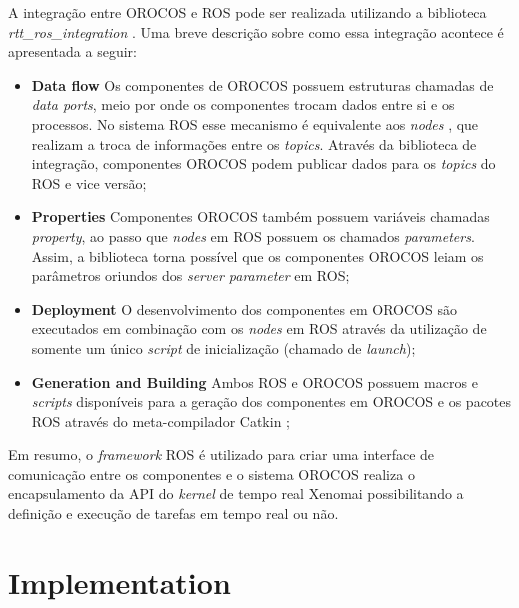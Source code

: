 \documentclass[conference]{IEEEtran}
\begin{document}
A integração entre OROCOS e ROS pode ser realizada utilizando a biblioteca \textit{rtt\_ros\_integration} \cite{rtt_ros_integration}. Uma breve descrição sobre como essa integração acontece é apresentada a seguir:

\begin{itemize}
	\item \textbf{Data flow} Os componentes de OROCOS possuem estruturas chamadas de \textit{data ports}, meio por onde os componentes trocam dados entre si e os processos. No sistema ROS esse mecanismo é equivalente aos \textit{nodes} , que realizam a troca de informações entre os \textit{topics}. Através da biblioteca de integração, componentes OROCOS podem publicar dados para os \textit{topics} do ROS e vice versão;
	
	\item \textbf{Properties} Componentes OROCOS também possuem variáveis chamadas \textit{property}, ao passo que \textit{nodes} em ROS possuem os chamados \textit{parameters}. Assim, a biblioteca torna possível que os componentes OROCOS leiam os parâmetros oriundos dos \textit{server parameter} em ROS;
	
	\item \textbf{Deployment} O desenvolvimento dos componentes em OROCOS são executados em combinação com os \textit{nodes} em ROS através da utilização de somente um único \textit{script} de inicialização (chamado de \textit{launch});
	
	\item \textbf{Generation and Building} Ambos ROS e OROCOS possuem macros e \textit{scripts} disponíveis para a geração dos componentes em OROCOS e os pacotes ROS através do meta-compilador Catkin \cite{catkin_ros} \cite{catkin_gentle_intro};
\end{itemize}

Em resumo, o \textit{framework} ROS é utilizado para criar uma interface de comunicação entre os componentes e o sistema OROCOS realiza o encapsulamento da API do \textit{kernel} de tempo real Xenomai possibilitando a definição e execução de tarefas em tempo real ou não.

\section{Implementation}\label{sec:implementation}
\end{document}
